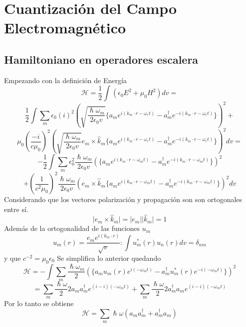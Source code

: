\documentclass{book}
\begin{document}
\section{Cuantización del Campo Electromagnético}
\subsection{Hamiltoniano en operadores escalera}Empezando con la definición de Energía
    \begin{equation}{ \mathcal{H}=\frac{1}{2}\int(\epsilon_0 E^2+\mu_0H^2) dv=}\end{equation}
    \begin{equation}{\frac{1}{2}\int \sum_m\epsilon_0(i)^2( \sqrt{\frac{\hslash\omega_m}{2\epsilon_0 v}}\lbrace a_me^{i({k}_m\cdot{r}-\omega_r t)}-a_m^\dag e^{-i({k}_m\cdot{r}-\omega_r t)}\rbrace)^2+} \end{equation}
    \begin{equation}{\mu_0(\frac{-i}{c\mu_0})^2(\sqrt{\frac{\hslash\omega_m}{2\epsilon_0 v}}{e}_m \times \hat{{k
    }}_m\lbrace a_me^{i({k}_m\cdot{r}-\omega_r t)}-a_m^\dag e^{-i({k}_m\cdot{r}-\omega_r t)}\rbrace)^2 dv =} \end{equation}
    \begin{equation}{-\frac{1}{2}\int \sum_m\epsilon_0^2\frac{\hslash \omega_m}{2\epsilon_0 v}( \lbrace a_me^{i({k}_m\cdot{r}-\omega_m t)}-a_m^\dag e^{-i({k}_m\cdot{r}-\omega_m t)}\rbrace)^2} \end{equation} \begin{equation}{+(\frac{1}{c^2\mu_0})^2\frac{\hslash\omega_m}{2\epsilon_0 v}({e}_m \times \hat{{k
    }}_m\lbrace a_me^{i({k}_m\cdot{r}-\omega_m t)}-a_m^\dag e^{-i({k}_m\cdot{r}-\omega_m t)}\rbrace)^2 dv} \end{equation}
    Considerando que los vectores polarización y propagación son son ortogonales entre sí.
    \begin{equation}{ \lvert{e}_m \times \hat{{k}}_m\rvert=\lvert{e}_m\rvert\lvert \hat{{k}}_m\rvert=1} \end{equation}
    Además de la ortogonalidad de las funciones ${u_m}$
    \begin{equation}{{u}_m({r})=\frac{{e}_m e^{i({k}_m\cdot{r})}}{\sqrt{v}} :\int{u}_m^{*}({r}){u}_n({r})dv=\delta_{nm}} \end{equation}
    y que ${c^{-2}=\mu_0\epsilon_0}$ Se simplifica lo anterior quedando
    \begin{equation}{ \mathcal{H}=-\int \sum_m\frac{\hslash \omega_m}{2}( \lbrace a_m{u}_m({r})e^{i(-\omega_m t)}-a_m^\dag{u}_m^*({r})e^{-i(-\omega_m t)}\rbrace)^2}\end{equation} \begin{equation}{=\sum_m \frac{\hslash\omega}{2} 2a_ma_m^\dag e^{(i-i)(-\omega_m t)}+\sum_m \frac{\hslash\omega}{2} 2a_m^\dag a_m e^{(i-i)(-\omega_m t)}}\end{equation}
    Por lo tanto se obtiene
    \begin{equation}{ \mathcal{H}=\sum_m \hslash\omega (a_ma_m^\dag+a_m^\dag a_m)}\end{equation}
\end{document}
